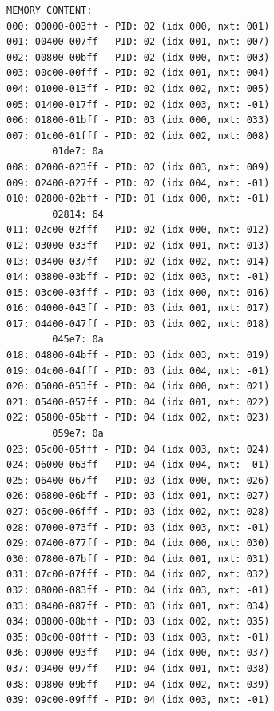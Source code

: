 \documentclass[a4paper]{article}
\numberwithin{equation}{section}
\begin{document}
\begin{mdframed}[leftline=false,rightline=false,backgroundcolor=grey!10,nobreak=false]
\begin{verbatim}
MEMORY CONTENT: 
000: 00000-003ff - PID: 02 (idx 000, nxt: 001)
001: 00400-007ff - PID: 02 (idx 001, nxt: 007)
002: 00800-00bff - PID: 02 (idx 000, nxt: 003)
003: 00c00-00fff - PID: 02 (idx 001, nxt: 004)
004: 01000-013ff - PID: 02 (idx 002, nxt: 005)
005: 01400-017ff - PID: 02 (idx 003, nxt: -01)
006: 01800-01bff - PID: 03 (idx 000, nxt: 033)
007: 01c00-01fff - PID: 02 (idx 002, nxt: 008)
        01de7: 0a
008: 02000-023ff - PID: 02 (idx 003, nxt: 009)
009: 02400-027ff - PID: 02 (idx 004, nxt: -01)
010: 02800-02bff - PID: 01 (idx 000, nxt: -01)
        02814: 64
011: 02c00-02fff - PID: 02 (idx 000, nxt: 012)
012: 03000-033ff - PID: 02 (idx 001, nxt: 013)
013: 03400-037ff - PID: 02 (idx 002, nxt: 014)
014: 03800-03bff - PID: 02 (idx 003, nxt: -01)
015: 03c00-03fff - PID: 03 (idx 000, nxt: 016)
016: 04000-043ff - PID: 03 (idx 001, nxt: 017)
017: 04400-047ff - PID: 03 (idx 002, nxt: 018)
        045e7: 0a
018: 04800-04bff - PID: 03 (idx 003, nxt: 019)
019: 04c00-04fff - PID: 03 (idx 004, nxt: -01)
020: 05000-053ff - PID: 04 (idx 000, nxt: 021)
021: 05400-057ff - PID: 04 (idx 001, nxt: 022)
022: 05800-05bff - PID: 04 (idx 002, nxt: 023)
        059e7: 0a
023: 05c00-05fff - PID: 04 (idx 003, nxt: 024)
024: 06000-063ff - PID: 04 (idx 004, nxt: -01)
025: 06400-067ff - PID: 03 (idx 000, nxt: 026)
026: 06800-06bff - PID: 03 (idx 001, nxt: 027)
027: 06c00-06fff - PID: 03 (idx 002, nxt: 028)
028: 07000-073ff - PID: 03 (idx 003, nxt: -01)
029: 07400-077ff - PID: 04 (idx 000, nxt: 030)
030: 07800-07bff - PID: 04 (idx 001, nxt: 031)
031: 07c00-07fff - PID: 04 (idx 002, nxt: 032)
032: 08000-083ff - PID: 04 (idx 003, nxt: -01)
033: 08400-087ff - PID: 03 (idx 001, nxt: 034)
034: 08800-08bff - PID: 03 (idx 002, nxt: 035)
035: 08c00-08fff - PID: 03 (idx 003, nxt: -01)
036: 09000-093ff - PID: 04 (idx 000, nxt: 037)
037: 09400-097ff - PID: 04 (idx 001, nxt: 038)
038: 09800-09bff - PID: 04 (idx 002, nxt: 039)
039: 09c00-09fff - PID: 04 (idx 003, nxt: -01)
  \end{verbatim}
\end{mdframed}
\end{document}
